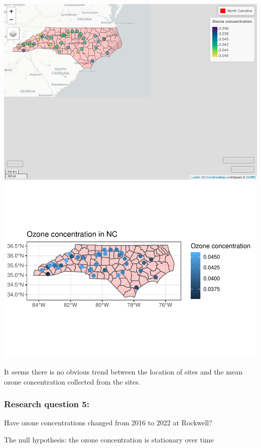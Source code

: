 \documentclass[
  12pt,
]{article}
\begin{document}
\includegraphics{Project_DataAnalysis_files/figure-latex/Q4 Spatial analysis-1.pdf}
\includegraphics{Project_DataAnalysis_files/figure-latex/Q4 Spatial analysis-2.pdf}

It seems there is no obvious trend between the location of sites and the
mean ozone concentration collected from the sites.

\hypertarget{research-question-5}{%
\subsubsection{Research question 5:}\label{research-question-5}}

Have ozone concentrations changed from 2016 to 2022 at Rockwell?

The null hypothesis: the ozone concentration is stationary over time
\end{document}
